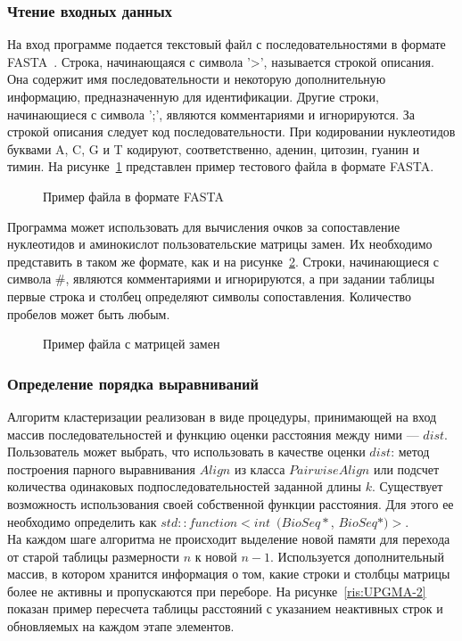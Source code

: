 \subsubsection[Чтение входных данных]{\large Чтение входных данных}
\hspace{\parindent} На вход программе подается текстовый файл с последовательностями в формате FASTA~\cite{FASTAformat}. Строка, начинающаяся с символа '>', называется строкой описания. Она содержит имя последовательности и некоторую дополнительную информацию, предназначенную для идентификации. Другие строки, начинающиеся с символа ';', являются комментариями и игнорируются. За строкой описания следует код последовательности. При кодировании нуклеотидов буквами A, C, G и T кодируют, соответственно, аденин, цитозин, гуанин и тимин. На рисунке~\ref{ris:FASTAexample} представлен пример тестового файла в формате FASTA.
\begin{figure}[H]
	\caption{Пример файла в формате FASTA}
	\label{ris:FASTAexample}
\end{figure}

Программа может использовать для вычисления очков за сопоставление нуклеотидов и аминокислот пользовательские матрицы замен. Их необходимо представить в таком же формате, как и на рисунке~\ref{ris:BLOSUM62}.
Строки, начинающиеся с символа $\#$, являются комментариями и игнорируются, а при задании таблицы первые строка и столбец определяют символы сопоставления. Количество пробелов может быть любым.

\begin{figure}[h]
	\caption{Пример файла с матрицей замен}
	\label{ris:BLOSUM62}
\end{figure}

\subsubsection[Определение порядка выравниваний]{\large Определение порядка выравниваний}
\hspace{\parindent} Алгоритм кластеризации реализован в виде процедуры, принимающей на вход массив последовательностей и функцию оценки расстояния между ними --- $dist$. Пользователь может выбрать, что использовать в качестве оценки $dist$: метод построения парного выравнивания $Align$ из класса $PairwiseAlign$ или подсчет количества одинаковых подпоследовательностей заданной длины $k$. Существует возможность использования своей собственной функции расстояния. Для этого ее необходимо определить как $std::function<int$~$(BioSeq*$, $BioSeq*)>$. \\
\indent На каждом шаге алгоритма не происходит выделение новой памяти для перехода от старой таблицы размерности $n$ к новой $n-1$. Используется дополнительный массив, в котором хранится информация о том, какие строки и столбцы матрицы более не активны и пропускаются при переборе. На рисунке~\ref{ris:UPGMA-2} показан пример пересчета таблицы расстояний с указанием неактивных строк и  обновляемых на каждом этапе элементов. 

